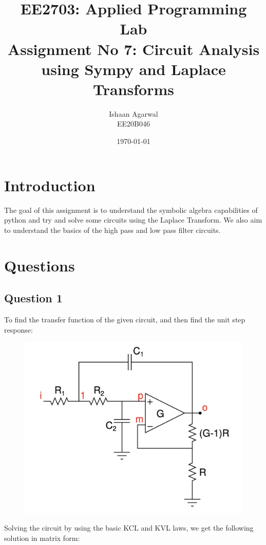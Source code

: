 \documentclass[11pt, a4paper]{article}
\title{EE2703: Applied Programming Lab \\ Assignment No 7: Circuit Analysis using Sympy and Laplace Transforms} %
\author{Ishaan Agarwal \\ EE20B046} %
\date{\today} %
\begin{document}
		
		
\maketitle %

\section{Introduction}
The goal of this assignment is to understand the symbolic algebra capabilities of python and try and solve some circuits using the Laplace Transform. We also aim to understand the basics of the high pass and low pass filter circuits.

\section{Questions}
\subsection{Question 1}
To find the transfer function of the given circuit, and then find the unit step response:

\begin{figure}[H]
     \centering
     \includegraphics[scale=0.3]{Figure_0.png}
\end{figure}

Solving the circuit by using the basic KCL and KVL laws, we get the following solution in matrix form:
\end{document}

